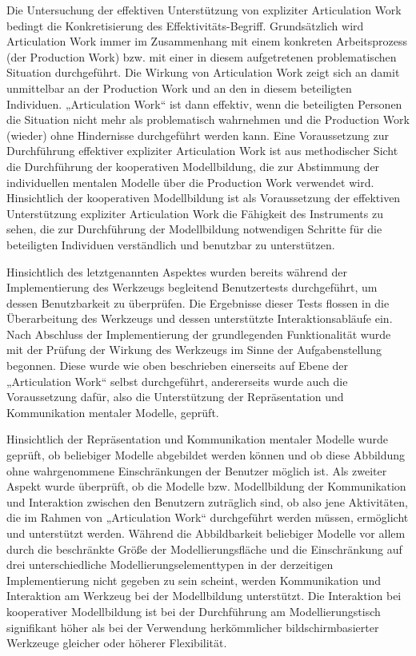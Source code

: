 Die Untersuchung der effektiven Unterstützung von expliziter Articulation Work bedingt die Konkretisierung des Effektivitäts-Begriff. Grundsätzlich wird Articulation Work immer im Zusammenhang mit einem konkreten Arbeitsprozess (der Production Work) bzw. mit einer in diesem aufgetretenen problematischen Situation durchgeführt. Die Wirkung von Articulation Work zeigt sich an damit unmittelbar an der Production Work und an den in diesem beteiligten Individuen. „Articulation Work“ ist dann effektiv, wenn die beteiligten Personen die Situation nicht mehr als problematisch wahrnehmen  und die Production Work (wieder) ohne Hindernisse durchgeführt werden kann. Eine Voraussetzung zur Durchführung effektiver expliziter Articulation Work ist aus methodischer Sicht die Durchführung der kooperativen Modellbildung, die zur Abstimmung der individuellen mentalen Modelle über die Production Work verwendet wird. Hinsichtlich der kooperativen Modellbildung ist als Voraussetzung der effektiven Unterstützung expliziter Articulation Work die Fähigkeit des Instruments zu sehen, die zur Durchführung der Modellbildung notwendigen Schritte für die beteiligten Individuen verständlich und benutzbar zu unterstützen.

Hinsichtlich des letztgenannten Aspektes wurden bereits während der Implementierung des Werkzeugs begleitend Benutzertests durchgeführt, um dessen Benutzbarkeit zu überprüfen. Die Ergebnisse dieser Tests flossen in die Überarbeitung des Werkzeugs und dessen unterstützte Interaktionsabläufe ein. Nach Abschluss der Implementierung der grundlegenden Funktionalität wurde mit der Prüfung der Wirkung des Werkzeugs im Sinne der Aufgabenstellung begonnen. Diese wurde wie oben beschrieben einerseits auf Ebene der „Articulation Work“ selbst durchgeführt, andererseits wurde auch die Voraussetzung dafür, also die Unterstützung der Repräsentation und Kommunikation mentaler Modelle, geprüft.

Hinsichtlich der Repräsentation und Kommunikation mentaler Modelle wurde geprüft, ob beliebiger Modelle abgebildet werden können und ob diese Abbildung ohne wahrgenommene Einschränkungen der Benutzer möglich ist. Als zweiter Aspekt wurde überprüft, ob die Modelle bzw. Modellbildung der Kommunikation und Interaktion zwischen den Benutzern zuträglich sind, ob also jene Aktivitäten, die im Rahmen von „Articulation Work“ durchgeführt werden müssen, ermöglicht und unterstützt werden. Während die Abbildbarkeit beliebiger Modelle vor allem durch die beschränkte Größe der Modellierungsfläche und die Einschränkung auf drei unterschiedliche Modellierungselementtypen in der derzeitigen Implementierung nicht gegeben zu sein scheint, werden Kommunikation und Interaktion am Werkzeug bei der Modellbildung unterstützt. Die Interaktion bei kooperativer Modellbildung ist bei der Durchführung am Modellierungstisch signifikant höher als bei der Verwendung herkömmlicher bildschirmbasierter Werkzeuge gleicher oder höherer Flexibilität.

